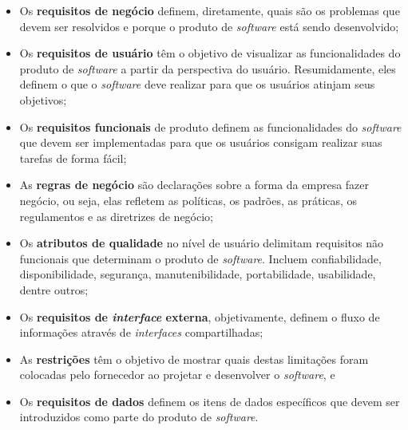 \begin{itemize}
\begin{itemize}
        \item Os \textbf{requisitos de negócio} definem, diretamente, quais são os problemas que devem ser resolvidos e porque o produto de \textit{software} está sendo desenvolvido;
        
        \item Os \textbf{requisitos de usuário} têm o objetivo de visualizar as funcionalidades do produto de \textit{software} a partir da perspectiva do usuário. Resumidamente, eles definem o que o \textit{software} deve realizar para que os usuários atinjam seus objetivos;
        
        \item Os \textbf{requisitos funcionais} de produto definem as funcionalidades do \textit{software} que devem ser implementadas para que os usuários consigam realizar suas tarefas de forma fácil;
        
        \item As \textbf{regras de negócio} são declarações sobre a forma da empresa fazer negócio, ou seja, elas refletem as políticas, os padrões, as práticas, os regulamentos e as diretrizes de negócio;
        
        \item Os \textbf{atributos de qualidade} no nível de usuário delimitam requisitos não funcionais que determinam o produto de \textit{software}. Incluem confiabilidade, disponibilidade, segurança, manutenibilidade, portabilidade, usabilidade, dentre outros;
        
        \item Os \textbf{requisitos de \textit{interface} externa}, objetivamente, definem o fluxo de informações através de \textit{interfaces} compartilhadas;
        
        \item As \textbf{restrições} têm o objetivo de mostrar quais destas limitações foram colocadas pelo fornecedor ao projetar e desenvolver o \textit{software}, e
        
        \item Os \textbf{requisitos de dados} definem os itens de dados específicos que devem ser introduzidos como parte do produto de \textit{software}.
    
    \end{itemize}
    

\end{itemize}
